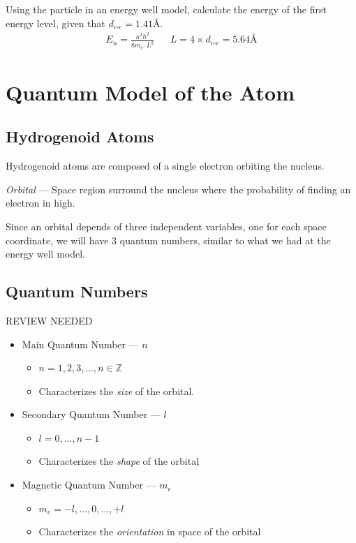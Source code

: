 \documentclass{article}[10pt]
\begin{document}
Using the particle in an energy well model, calculate the energy of the first energy
level, given that $d_{\text{c-c}}=1.41\si{\angstrom}$.
\begin{align*}
	E_n = \frac{n^2h^2}{8m_{e^{-}}L^2} &   & L=4\times d_{\text{c-c}}=5.64\si{\angstrom}
\end{align*}
\section{Quantum Model of the Atom}
\subsection{Hydrogenoid Atoms}
Hydrogenoid atoms are composed of a single electron orbiting the nucleus.

\emph{Orbital} --- Space region surround the nucleus where the probability of
finding an electron in high.

Since an orbital depends of three independent variables, one for each space
coordinate, we will have 3 quantum numbers, similar to what we had at the energy
well model.
\subsection{Quantum Numbers}
REVIEW NEEDED
\begin{itemize}
    \item Main Quantum Number --- $n$
    \begin{itemize}
        \item $n=1,2,3,\ldots,n\in\mathbb Z$
        \item Characterizes the \emph{size} of the orbital.
    \end{itemize}
    \item Secondary Quantum Number --- $l$
    \begin{itemize}
        \item $l=0,\ldots,n-1$\\
        \item Characterizes the \emph{shape} of the orbital
    \end{itemize}
    \item Magnetic Quantum Number --- $m_e$
    \begin{itemize}
        \item $m_e = -l,\ldots,0,\ldots,+l$
        \item Characterizes the \emph{orientation} in space of the orbital
    \end{itemize}
\end{itemize}
\end{document}
